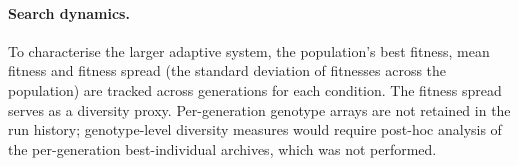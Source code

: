 \paragraph{Search dynamics.}
To characterise the larger adaptive system, the population's best fitness, mean
fitness and fitness spread (the standard deviation of fitnesses across the
population) are tracked across generations for each condition. The fitness
spread serves as a diversity proxy. Per-generation genotype arrays are not
retained in the run history; genotype-level diversity measures would require
post-hoc analysis of the per-generation best-individual archives, which was not
performed.
